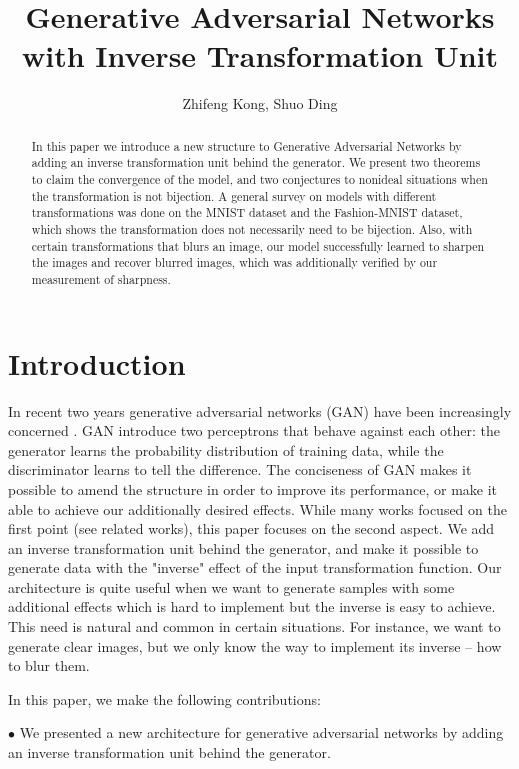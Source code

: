 \documentclass{article}
\author{Zhifeng Kong, Shuo Ding}
\title{Generative Adversarial Networks \\with Inverse Transformation Unit}
\date{}
\begin{document}
\maketitle


\begin{abstract}
In this paper we introduce a new structure to Generative Adversarial Networks by adding an inverse transformation unit behind the generator. We present two theorems to claim the convergence of the model, and two conjectures to nonideal situations when the transformation is not bijection. A general survey on models with different transformations was done on the MNIST dataset and the Fashion-MNIST dataset, which shows the transformation does not necessarily need to be bijection. Also, with certain transformations that blurs an image, our model successfully learned to sharpen the images and recover blurred images, which was additionally verified by our measurement of sharpness.


\end{abstract}

\section{Introduction}
In recent two years generative adversarial networks (GAN) have been increasingly concerned \cite{GAN}. GAN introduce two perceptrons that behave against each other: the generator learns the probability distribution of training data, while the discriminator learns to tell the difference. The conciseness of GAN makes it possible to amend the structure in order to improve its performance, or make it able to achieve our additionally desired effects. While many works focused on the first point (see related works), this paper focuses on the second aspect. We add an inverse transformation unit behind the generator, and make it possible to generate data with the "inverse" effect of the input transformation function. Our architecture is quite useful when we want to generate samples with some additional effects which is hard to implement but the inverse is easy to achieve. This need is natural and common in certain situations. For instance, we want to generate clear images, but we only know the way to implement its inverse -- how to blur them.

In this paper, we make the following contributions:

$\bullet$
We presented a new architecture for generative adversarial networks by adding an inverse transformation unit behind the generator.
\end{document}
